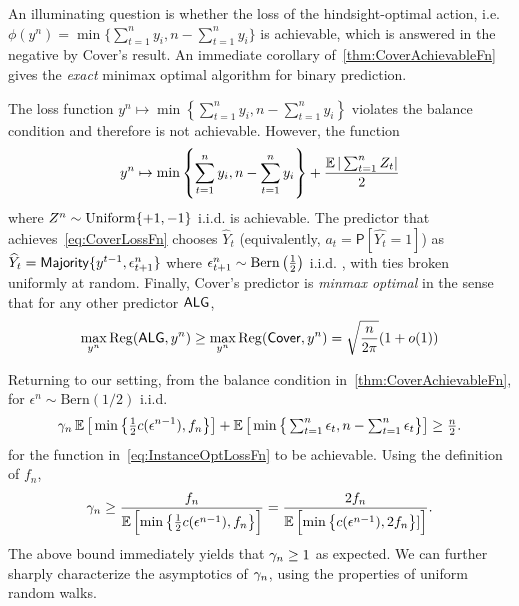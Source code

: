An illuminating question is whether the loss of the hindsight-optimal action, i.e. $\phi(y^n) = \min\{\sum_{t=1}^n y_i, n-\sum_{t=1}^n y_i\}$ is achievable, which is answered in the negative by Cover's result. An immediate corollary of~\cref{thm:CoverAchievableFn} gives the \emph{exact} minimax optimal algorithm for binary prediction. 

\begin{corollary} \label{cor:BinPredOptReg}
    The loss function $y^n \mapsto \min\left\{\sum_{t=1}^n y_i, n-\sum_{t=1}^n y_i\right\}$ violates the balance condition and therefore is not achievable. However, the function 
    \begin{align}
    \label{eq:CoverLossFn}
    y^n \mapsto \min\left\{\sum_{t=1}^n y_i, n-\sum_{t=1}^n y_i\right\} + \frac{\operatorname{\mathbb{E}}|\sum_{t=1}^n Z_t|}{2}
    \end{align}
    where $Z^n \sim \mathrm{Uniform}\{+1,-1\}$ i.i.d. is achievable. The predictor that achieves~\cref{eq:CoverLossFn} chooses $\widehat{Y}_t$ (equivalently, $a_t = \mathsf{P}[\widehat{Y_t} = 1]$) as
        $\widehat{Y}_t = \mathsf{Majority}\{y^{t-1},\epsilon_{t+1}^n\}$
    where $\epsilon_{t+1}^n \sim \mathrm{Bern}\left(\frac{1}{2}\right)$ i.i.d. , with ties broken uniformly at random. Finally, Cover's predictor is \emph{minmax optimal} in the sense that for any other predictor $\mathsf{ALG}$, 
    \[
    \max_{y^n} \mathrm{Reg}(\mathsf{ALG}, y^n) \ge \max_{y^n} \mathrm{Reg}(\mathsf{Cover}, y^n) = \sqrt{\frac{n}{2\pi}}(1+o(1))
    \]
\end{corollary}


Returning to our setting, from the balance condition in~\cref{thm:CoverAchievableFn}, for $\epsilon^n \sim \mathrm{Bern}(1/2)$ i.i.d. 
\begin{align*}
\gamma_n \operatorname{\mathbb{E}}\big[\min\big\{\tfrac12 c(\epsilon^{n-1}), f_n\big\}\big] 
+ \operatorname{\mathbb{E}}\big[ \min\big\{\textstyle\sum_{t=1}^n \epsilon_t, n-\textstyle\sum_{t=1}^n \epsilon_t\big\}\big] \ge \frac{n}{2}.
\end{align*}
for the function in~\eqref{eq:InstanceOptLossFn} to be achievable. Using the definition of $f_n$, 
\begin{align*}
    \gamma_n \ge \frac{f_n}{\operatorname{\mathbb{E}}\left[ \min\left\{\tfrac12 c(\epsilon^{n-1}), f_n\right\}\right]} =  \frac{2f_n}{\operatorname{\mathbb{E}}\left[\min\left\{c(\epsilon^{n-1}), 2f_n\right\}]\right]}.
\end{align*}
The above bound immediately yields that $\gamma_n \ge 1$ as expected. We can further sharply characterize the asymptotics of $\gamma_n$, using the properties of uniform random walks. \\


